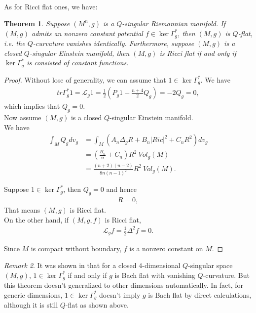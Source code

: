 \documentclass[12pt]{amsart}
\newtheorem{theorem}{Theorem}[section]
\theoremstyle{definition}
\theoremstyle{remark}
\newtheorem{remark}[theorem]{Remark}
\numberwithin{equation}{section}
\begin{document}
As for Ricci flat ones, we have:

\begin{theorem}\label{Static_Ricci_flat}
Suppose $(M^n,g)$ is a $Q$-singular Riemannian manifold. If $(M,g)$ admits an nonzero constant potential $f \in \ker \Gamma_g^*$, then $(M,g)$ is $Q$-flat, \emph{i.e.} the $Q$-curvature vanishes identically. Furthermore, suppose $(M,g)$ is a closed $Q$-singular Einstein manifold, then $(M,g)$ is Ricci flat if and only if $\ker \Gamma_g^*$ is consisted of constant functions.
\end{theorem}

\begin{proof}

Without lose of generality, we can assume that $1 \in \ker \Gamma_g^*$. We have
\begin{align*}
tr\Gamma^{*}_{g} 1 = \mathscr{L}_g 1  = \frac{1}{2} \left( P_g 1 - \frac{n+4}{2}Q_g\right) =  - 2 Q_g = 0,
\end{align*}
which implies that $Q_g=0$.\\

Now assume $(M,g)$ is a closed $Q$-singular Einstein manifold.\\

We have
\begin{align*}
\int_M Q_g dv_g &= \int_M \left(A_n \Delta_{g} R + B_n |Ric|^2 + C_n R^2\right) dv_g \\
&= \left(\frac{B_n}{n} + C_n \right) R^2\ Vol_g(M) \\
&= \frac{(n+2)(n-2)}{8n(n-1)^2}R^2\ Vol_g(M).
\end{align*}

Suppose $1 \in \ker \Gamma_g^*$, then $Q_g = 0$ and hence 
\begin{align*}
R = 0 ,
\end{align*}
That means $(M, g)$ is Ricci flat.\\

On the other hand, if $(M,g, f)$ is Ricci flat, 
\begin{align*}
\mathscr{L}_g f = \frac{1}{2}\Delta^2 f = 0.
\end{align*}

Since $M$ is compact without boundary, $f$ is a nonzero constant on $M$.

\end{proof}

\begin{remark}
It was shown in \cite{C-G-Y} that for a closed $4$-dimensional $Q$-singular space $(M, g)$, $1 \in \ker \Gamma_g^*$ if and only if $g$ is Bach flat with vanishing $Q$-curvature. But this theorem doesn't generalized to other dimensions automatically. In fact, for generic dimensions, $1 \in \ker \Gamma_g^*$ doesn't imply $g$ is Bach flat by direct calculations, although it is still $Q$-flat as shown above. 
\end{remark}
\end{document}
